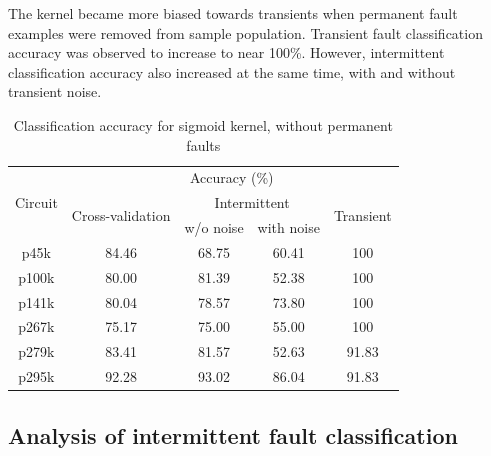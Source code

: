 The kernel became more biased towards transients when permanent fault examples were removed from sample population. Transient fault classification accuracy was observed to increase to near 100\%. However, intermittent classification accuracy also increased at the same time, with and without transient noise.

\begin{table}[h]
\captionsetup{justification=centering}
\begin{tabular}{ccccc}
\hline
\multirow{3}{*}{Circuit} & \multicolumn{4}{c}{Accuracy (\%)}                                                                 \\ \cline{2-5} 
                         & \multirow{2}{*}{Cross-validation} & \multicolumn{2}{c}{Intermittent} & \multirow{2}{*}{Transient} \\ \cline{3-4}
                         &                                   & w/o noise      & with noise      &                            \\ \hline
p45k                     & 84.46                             & 68.75          & 60.41           & 100                        \\
p100k                    & 80.00                             & 81.39          & 52.38           & 100                        \\
p141k                    & 80.04                             & 78.57          & 73.80           & 100                        \\
p267k                    & 75.17                             & 75.00          & 55.00           & 100                        \\
p279k                    & 83.41                             & 81.57          & 52.63           & 91.83                      \\
p295k                    & 92.28                             & 93.02          & 86.04           & 91.83                     \\
\hline
\end{tabular}
\caption {Classification accuracy for sigmoid kernel, without permanent faults}
\label{tab:sigwop}
\end{table}

\subsection{Analysis of intermittent fault classification}


